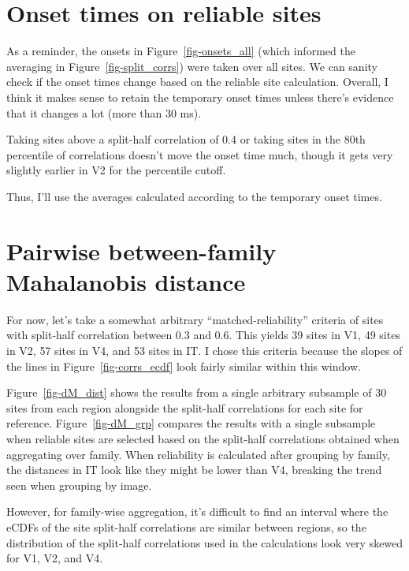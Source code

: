 \documentclass[
  10pt,
  letterpaper,
  DIV=11,
  numbers=noendperiod]{scrartcl}
\begin{document}
\section{Onset times on reliable
sites}\label{onset-times-on-reliable-sites}

As a reminder, the onsets in Figure~\ref{fig-onsets_all} (which informed
the averaging in Figure~\ref{fig-split_corrs}) were taken over all
sites. We can sanity check if the onset times change based on the
reliable site calculation. Overall, I think it makes sense to retain the
temporary onset times unless there's evidence that it changes a lot
(more than 30 ms).

Taking sites above a split-half correlation of 0.4 or taking sites in
the 80th percentile of correlations doesn't move the onset time much,
though it gets very slightly earlier in V2 for the percentile cutoff.

Thus, I'll use the averages calculated according to the temporary onset
times.

\section{Pairwise between-family Mahalanobis
distance}\label{pairwise-between-family-mahalanobis-distance}

For now, let's take a somewhat arbitrary ``matched-reliability''
criteria of sites with split-half correlation between 0.3 and 0.6. This
yields 39 sites in V1, 49 sites in V2, 57 sites in V4, and 53 sites in
IT. I chose this criteria because the slopes of the lines in
Figure~\ref{fig-corrs_ecdf} look fairly similar within this window.

Figure~\ref{fig-dM_dist} shows the results from a single arbitrary
subsample of 30 sites from each region alongside the split-half
correlations for each site for reference. Figure~\ref{fig-dM_grp}
compares the results with a single subsample when reliable sites are
selected based on the split-half correlations obtained when aggregating
over family. When reliability is calculated after grouping by family,
the distances in IT look like they might be lower than V4, breaking the
trend seen when grouping by image.

However, for family-wise aggregation, it's difficult to find an interval
where the eCDFs of the site split-half correlations are similar between
regions, so the distribution of the split-half correlations used in the
calculations look very skewed for V1, V2, and V4.
\end{document}
